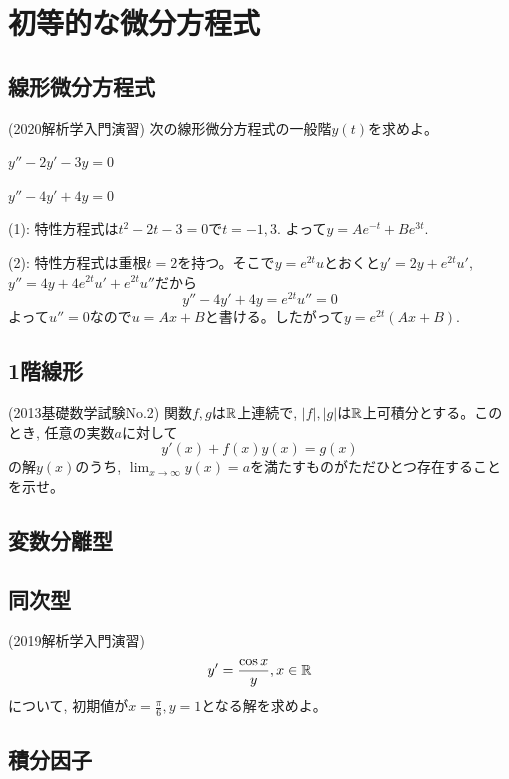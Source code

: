 \section{初等的な微分方程式}
\subsection{線形微分方程式}
\begin{egprob} (2020解析学入門演習)
次の線形微分方程式の一般階$y(t)$を求めよ。
\ben
\item $y'' - 2y' - 3y = 0$
\item $y'' - 4y' + 4y = 0$
\een
\end{egprob}
\begin{egans}
(1): 特性方程式は$t^2 - 2t - 3 = 0$で$t=-1,3$. よって$y=Ae^{-t} + Be^{3t}$.

(2): 特性方程式は重根$t=2$を持つ。そこで$y=e^{2t}u$とおくと$y'= 2y + e^{2t}u'$, $y'' = 4y  + 4e^{2t}u' + e^{2t}u''$だから
\[y''-4y' + 4y = e^{2t}u'' = 0\]
よって$u'' = 0$なので$u= Ax+B$と書ける。したがって$y=e^{2t}(Ax + B)$.
\end{egans}
\subsection{1階線形}

\begin{egprob} (2013基礎数学試験No.2)
関数$f,g$は$\mathbb{R}$上連続で, $|f|, |g|$は$\mathbb{R}$上可積分とする。このとき, 任意の実数$a$に対して
\[y'(x) + f(x)y(x) = g(x)\]
の解$y(x)$のうち, $\lim_{x\to \infty} y(x) = a$を満たすものがただひとつ存在することを示せ。
\end{egprob}




\subsection{変数分離型}


\subsection{同次型}
\begin{egprob} (2019解析学入門演習)
\[y' = \dfrac{\cos{x}}{y}, x\in \mathbb{R}\]
について, 初期値が$x=\frac{\pi}{6}, y=1$となる解を求めよ。
\end{egprob}
\subsection{積分因子}


